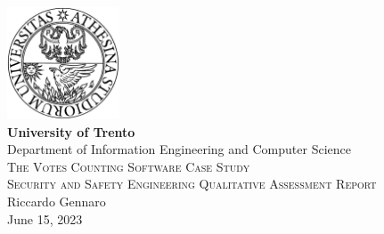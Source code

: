 \pagestyle{plain}

\thispagestyle{empty}

\begin{center}

  \includegraphics[width=0.25\textwidth]{I-initFolder/images/TrentoLOGO_2.png}\\[0.5cm]
  
  \textbf{\Large\textbf{University of Trento}}\\[0.5cm]
  
  Department of Information Engineering and Computer Science\\[4cm]
  
  \textsc{\huge The Votes Counting Software Case Study}\\[0.5cm]
  
  \textsc{Security and Safety Engineering Qualitative Assessment Report}\\[1.5cm]
  
  Riccardo Gennaro\\[0.5cm] 
  
  {June 15, 2023}

\end{center}